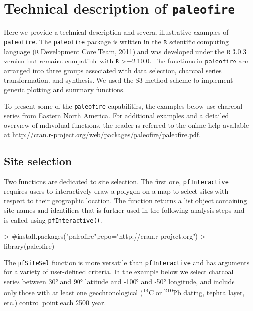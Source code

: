 \documentclass{elsarticle}
\begin{document}
\section{Technical description of \texttt{paleofire}}

Here we provide a technical description and several illustrative examples of \texttt{paleofire}. The \texttt{paleofire} package is written in the \texttt{R} scientific computing language (\texttt{R} Development Core Team, 2011) and was developed under the \texttt{R} 3.0.3 version but remains compatible with \texttt{R} >=2.10.0. The functions in \texttt{paleofire} are arranged into three groups associated with data selection, charcoal series transformation, and synthesis. We used the S3 method scheme to implement generic plotting and summary functions.

To present some of the \texttt{paleofire} capabilities, the examples below use charcoal series from Eastern North America. For additional examples and a detailed overview of individual functions, the reader is referred to the online help available at \url{http://cran.r-project.org/web/packages/paleofire/paleofire.pdf}.

\subsection{Site selection}

Two functions are dedicated to site selection. The first one, \texttt{pfInteractive} requires users to interactively draw a polygon on a map to select sites with respect to their geographic location. The function returns a list object containing site names and identifiers that is further used in the following analysis steps and is called using \texttt{pfInteractive()}.


\begin{Schunk}
\begin{Sinput}
> #install.packages("paleofire",repo="http://cran.r-project.org")
> library(paleofire)
\end{Sinput}
\end{Schunk}


The \texttt{pfSiteSel} function is more versatile than \texttt{pfInteractive} and has arguments for a variety of user-defined criteria. In the example below we select charcoal series between 30° and 90° latitude and -100° and -50° longitude, and include only those with at least one geochronological (\textsuperscript{14}C or \textsuperscript{210}Pb dating, tephra layer, etc.) control point each 2500 year. 
\end{document}
